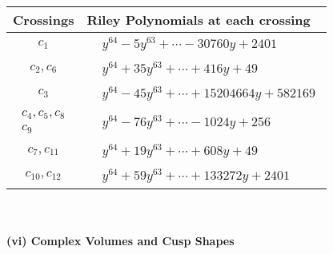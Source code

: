 \documentclass[1p]{elsarticle_modified}
\theoremstyle{definition}
\begin{document}
\begin{tabular}{m{50pt}|m{274pt}}
Crossings & \hspace{64pt}Riley Polynomials at each crossing \\
\hline $$\begin{aligned}c_{1}\end{aligned}$$&$\begin{aligned}
&y^{64}-5 y^{63}+\cdots-30760 y+2401
\end{aligned}$\\
\hline $$\begin{aligned}c_{2},c_{6}\end{aligned}$$&$\begin{aligned}
&y^{64}+35 y^{63}+\cdots+416 y+49
\end{aligned}$\\
\hline $$\begin{aligned}c_{3}\end{aligned}$$&$\begin{aligned}
&y^{64}-45 y^{63}+\cdots+15204664 y+582169
\end{aligned}$\\
\hline $$\begin{aligned}c_{4},c_{5},c_{8}\\c_{9}\end{aligned}$$&$\begin{aligned}
&y^{64}-76 y^{63}+\cdots-1024 y+256
\end{aligned}$\\
\hline $$\begin{aligned}c_{7},c_{11}\end{aligned}$$&$\begin{aligned}
&y^{64}+19 y^{63}+\cdots+608 y+49
\end{aligned}$\\
\hline $$\begin{aligned}c_{10},c_{12}\end{aligned}$$&$\begin{aligned}
&y^{64}+59 y^{63}+\cdots+133272 y+2401
\end{aligned}$\\
\hline
\end{tabular}\\~\\
\newpage\flushleft \textbf{(vi) Complex Volumes and Cusp Shapes}
\end{document}
